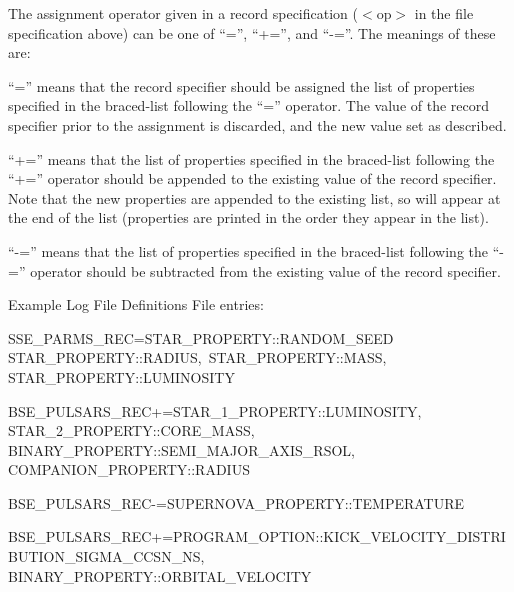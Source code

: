 The assignment operator given in a record specification ($\mathrm{<}$op$\mathrm{>}$ in the file specification above) can be one of ``='', ``+='', and ``-=''.  The meanings of these are:

\bigskip
\hfill
\begin{minipage}{\dimexpr\textwidth-1.5cm}
``='' means that the record specifier should be assigned the list of properties specified in the braced-list following the ``='' operator. The value of the record specifier prior to the assignment is discarded, and the new value set as described.
\end{minipage}

\bigskip
\hfill
\begin{minipage}{\dimexpr\textwidth-1.5cm}
``+='' means that the list of properties specified in the braced-list following the ``+='' operator should be appended to the existing value of the record specifier. Note that the new properties are appended to the existing list, so will appear at the end of the list (properties are printed in the order they appear in the list).
\end{minipage}

\bigskip
\hfill
\begin{minipage}{\dimexpr\textwidth-1.5cm}
``-='' means that the list of properties specified in the braced-list following the ``-='' operator should be subtracted from the existing value of the record specifier.
\end{minipage}

\bigskip
Example Log File Definitions File entries:
\bigskip

\small
SSE\_PARMS\_REC\tabto{9.65em}=\tabto{11em}\lcb\tabto{11.6em}STAR\_PROPERTY::RANDOM\_SEED \\
\tabto{11.6em}STAR\_PROPERTY::RADIUS,\ STAR\_PROPERTY::MASS,
\tabto{11.6em}STAR\_PROPERTY::LUMINOSITY\ \rcb

\medskip
BSE\_PULSARS\_REC\tabto{9em}+=\tabto{11em}\lcb\tabto{11.6em}STAR\_1\_PROPERTY::LUMINOSITY, \\
\tabto{11.6em}STAR\_2\_PROPERTY::CORE\_MASS, \\
\tabto{11.6em}BINARY\_PROPERTY::SEMI\_MAJOR\_AXIS\_RSOL, \\
\tabto{11.6em}COMPANION\_PROPERTY::RADIUS\ \rcb

\medskip
BSE\_PULSARS\_REC\tabto{9em}-=\tabto{11em}\lcb\tabto{11.6em}SUPERNOVA\_PROPERTY::TEMPERATURE\ \rcb

\medskip
BSE\_PULSARS\_REC\tabto{9em}+=\tabto{11em}\lcb\tabto{11.6em}PROGRAM\_OPTION::KICK\_VELOCITY\_DISTRIBUTION\_SIGMA\_CCSN\_NS,
\tabto{11.6em}BINARY\_PROPERTY::ORBITAL\_VELOCITY\ \rcb

